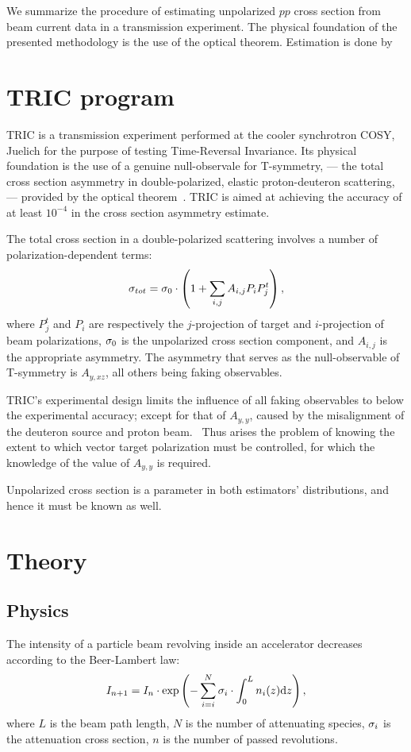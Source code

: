 \documentclass[reprint]{revtex4-1}
\newcommand{\td}{\mathrm{d}}
\begin{document}
\begin{abstractname}
We summarize the procedure of estimating unpolarized $pp$ cross section from beam current data in a transmission experiment. The  physical foundation of the presented methodology is the use of the optical theorem. Estimation is done by 
\end{abstractname}

\section{TRIC program}

TRIC is a transmission experiment performed at the cooler synchrotron COSY, Juelich for the purpose of testing Time-Reversal Invariance. Its physical foundation is the use of a genuine null-observale for T-symmetry, --- the total cross section asymmetry in double-polarized, elastic proton-deuteron scattering, --- provided by the optical theorem~\cite{Conzett}. TRIC is aimed at achieving the accuracy of at least $10^{-4}$ in the cross section asymmetry estimate.

The total cross section in a double-polarized scattering involves a number of polarization-dependent terms:
\[
	\CS[tot] = \CS[0]\cdot\bkt{1 + \sum_{i,j} A_{i,j} P_iP^t_j},
\]
where $P^t_j$ and $P_i$ are respectively the $j$-projection of target and $i$-projection of beam polarizations, $\CS[0]$ is the unpolarized cross section component, and $A_{i,j}$ is the appropriate asymmetry. The asymmetry that serves as the null-observable of T-symmetry is $A_{y,xz}$, all others being faking observables. 

TRIC's experimental design limits the influence of all faking observables to below the experimental accuracy; except for that of $A_{y,y}$, caused by the misalignment of the deuteron source and proton beam.~\cite[p. 9]{Proposal} Thus arises the problem of knowing the extent to which vector target polarization must be controlled, for which the knowledge of the value of $A_{y,y}$ is required. 

Unpolarized cross section is a parameter in both estimators' distributions, and hence it must be known as well. 

\section{Theory}
\subsection{Physics}
The intensity of a particle beam revolving inside an accelerator decreases according to the Beer-Lambert law:
\[
	I_{n+1} = I_n \cdot \exp\bkt{-\sum_{i=i}^N \CS[i]\cdot\int_0^L n_i(z)\td z},
\]
where $L$ is the beam path length, $N$ is the number of attenuating species, $\CS[i]$ is the attenuation cross section, $n$ is the number of passed revolutions.
\end{document}
